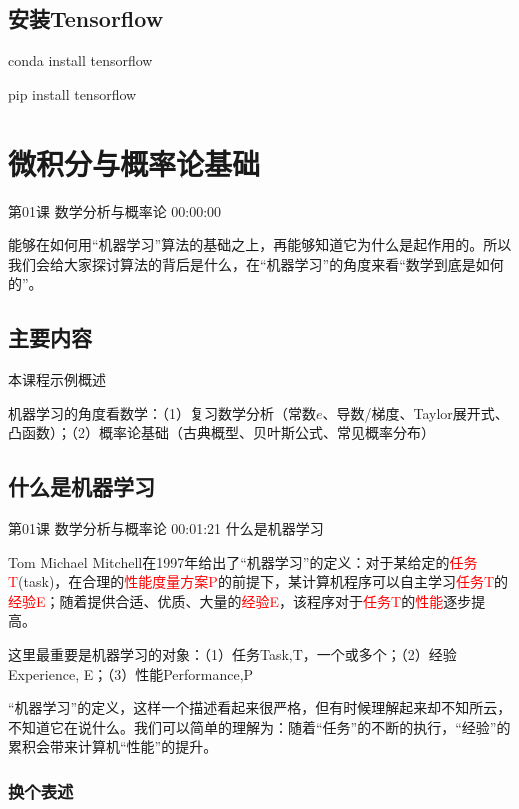 \documentclass[UTF8]{ctexart}
\begin{document}
\subsection{安装Tensorflow}

        conda install tensorflow

        pip install tensorflow

\section{微积分与概率论基础}

第01课 数学分析与概率论 00:00:00

能够在如何用“机器学习”算法的基础之上，再能够知道它为什么是起作用的。所以我们会给大家探讨算法的背后是什么，在“机器学习”的角度来看“数学到底是如何的”。

\subsection{主要内容}

本课程示例概述

机器学习的角度看数学：（1）复习数学分析（常数$e$、导数/梯度、Taylor展开式、凸函数）；（2）概率论基础（古典概型、贝叶斯公式、常见概率分布）

\subsection{什么是机器学习}

第01课 数学分析与概率论 00:01:21 什么是机器学习

 Tom Michael Mitchell在1997年给出了“机器学习”的定义：对于某给定的\textcolor{red}{任务T}(task)，在合理的\textcolor{red}{性能度量方案P}的前提下，某计算机程序可以自主学习\textcolor{red}{任务T}的\textcolor{red}{经验E}；随着提供合适、优质、大量的\textcolor{red}{经验E}，该程序对于\textcolor{red}{任务T}的\textcolor{red}{性能}逐步提高。

这里最重要是机器学习的对象：（1）任务Task,T，一个或多个；（2）经验Experience, E；（3）性能Performance,P

“机器学习”的定义，这样一个描述看起来很严格，但有时候理解起来却不知所云，不知道它在说什么。我们可以简单的理解为：随着“任务”的不断的执行，“经验”的累积会带来计算机“性能”的提升。

\subsubsection{换个表述}
\end{document}
